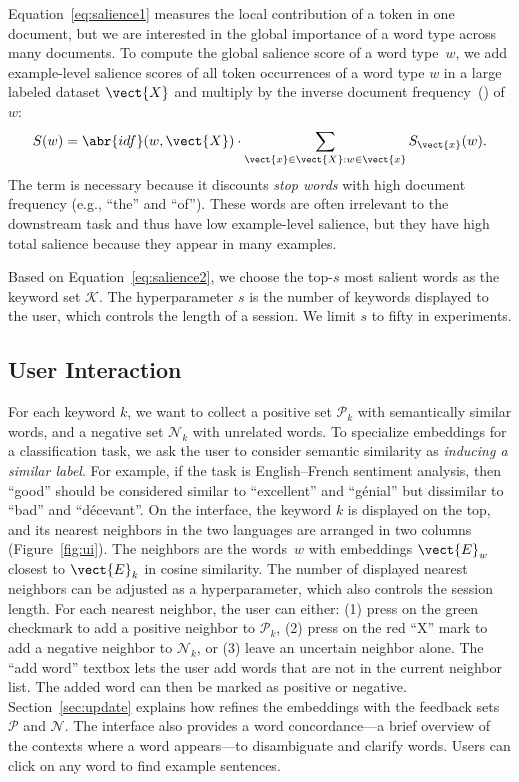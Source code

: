 Equation~\ref{eq:salience1} measures the local contribution of a token in one
document, but we are interested in the global importance of a word type across
many documents.
To compute the global salience score of a word type~$w$, we add example-level salience
scores of all token occurrences of a word type $w$ in a large labeled dataset $\vect{X}$ and
multiply by the inverse document frequency~() of $w$:
\begin{equation}
S(w) = \abr{idf}(w, \vect{X}) \cdot \sum_{\vect{x} \in
\vect{X}: w \in \vect{x}} S_{\vect{x}}(w).
\label{eq:salience2}
\end{equation}
The  term is necessary because it discounts \emph{stop words} with
high document frequency (e.g., ``the'' and ``of'').
These words are often irrelevant to the downstream task and thus have low example-level salience, but they have high total salience because they appear in many examples.

Based on Equation~\ref{eq:salience2}, we choose the top-$s$ most salient words as the keyword set $\mathcal{K}$.
The hyperparameter $s$ is the number of keywords displayed to the user, which controls the
length of a \name{} session.  We limit $s$ to fifty in experiments.

\subsection{User Interaction}
\label{ssec:interaction}
For each keyword $k$, we want to collect a positive set $\mathcal{P}_k$ with
semantically similar words, and a negative set $\mathcal{N}_k$ with unrelated
words.
To specialize embeddings for a classification task, we ask the user to
consider semantic similarity as \emph{inducing a similar label}.
For example, if the task is English--French sentiment analysis, then ``good'' should be considered similar to ``excellent'' and ``g\'enial''
but dissimilar to ``bad'' and ``d\'ecevant''.
On the interface, the keyword $k$ is displayed on the top, and its nearest neighbors in the
two languages are arranged in two columns (Figure~\ref{fig:ui}).
The neighbors are the words~$w$ with embeddings $\vect{E}_w$ closest to
$\vect{E}_k$ in cosine similarity.
The number of displayed nearest neighbors can be adjusted
as a hyperparameter, which also controls the session length.
For each nearest neighbor, the user can either: (1) press on the green
checkmark to add a positive neighbor to $\mathcal{P}_k$, (2) press on the red
``X'' mark to add a negative neighbor to $\mathcal{N}_k$, or (3) leave an
uncertain neighbor alone.
The ``add word'' textbox lets the user add words that are not in the
current neighbor list.
The added word can then be marked as positive or negative.
Section~\ref{sec:update} explains how \name{} refines the embeddings with the feedback sets
$\mathcal{P}$ and $\mathcal{N}$.
The interface also provides a word concordance---a brief overview of the contexts
where a word appears---to disambiguate and clarify words.
Users can click on any word to find example sentences.
